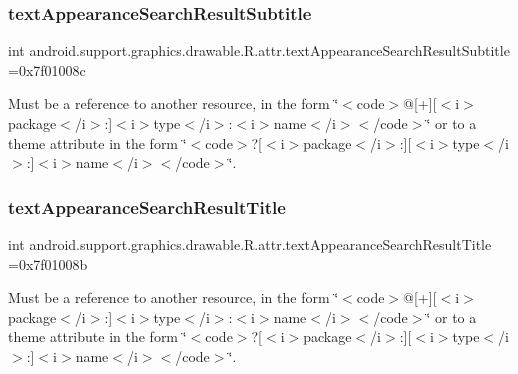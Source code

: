 \subsubsection{\texorpdfstring{text\+Appearance\+Search\+Result\+Subtitle}{textAppearanceSearchResultSubtitle}}
{\footnotesize\ttfamily int android.\+support.\+graphics.\+drawable.\+R.\+attr.\+text\+Appearance\+Search\+Result\+Subtitle =0x7f01008c\hspace{0.3cm}{\ttfamily [static]}}

Must be a reference to another resource, in the form \char`\"{}$<$code$>$@\mbox{[}+\mbox{]}\mbox{[}$<$i$>$package$<$/i$>$\+:\mbox{]}$<$i$>$type$<$/i$>$\+:$<$i$>$name$<$/i$>$$<$/code$>$\char`\"{} or to a theme attribute in the form \char`\"{}$<$code$>$?\mbox{[}$<$i$>$package$<$/i$>$\+:\mbox{]}\mbox{[}$<$i$>$type$<$/i$>$\+:\mbox{]}$<$i$>$name$<$/i$>$$<$/code$>$\char`\"{}. \mbox{\label{classandroid_1_1support_1_1graphics_1_1drawable_1_1R_1_1attr_a277bab4568ba3ba9f5ce2bbd30df01c0}} 
\subsubsection{\texorpdfstring{text\+Appearance\+Search\+Result\+Title}{textAppearanceSearchResultTitle}}
{\footnotesize\ttfamily int android.\+support.\+graphics.\+drawable.\+R.\+attr.\+text\+Appearance\+Search\+Result\+Title =0x7f01008b\hspace{0.3cm}{\ttfamily [static]}}

Must be a reference to another resource, in the form \char`\"{}$<$code$>$@\mbox{[}+\mbox{]}\mbox{[}$<$i$>$package$<$/i$>$\+:\mbox{]}$<$i$>$type$<$/i$>$\+:$<$i$>$name$<$/i$>$$<$/code$>$\char`\"{} or to a theme attribute in the form \char`\"{}$<$code$>$?\mbox{[}$<$i$>$package$<$/i$>$\+:\mbox{]}\mbox{[}$<$i$>$type$<$/i$>$\+:\mbox{]}$<$i$>$name$<$/i$>$$<$/code$>$\char`\"{}. \mbox{\label{classandroid_1_1support_1_1graphics_1_1drawable_1_1R_1_1attr_a3b4c7fe5cbadb4c9b027c2a03e363a25}} 
